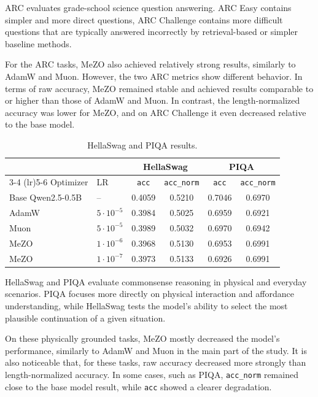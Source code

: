 \documentclass{article}
\begin{document}
ARC evaluates grade-school science question answering. ARC Easy contains simpler and more direct questions, ARC Challenge contains more difficult questions that are typically answered incorrectly by retrieval-based or simpler baseline methods. 

For the ARC tasks, MeZO also achieved relatively strong results, similarly to AdamW and Muon. However, the two ARC metrics show different behavior. In terms of raw accuracy, MeZO remained stable and achieved results comparable to or higher than those of AdamW and Muon. In contrast, the length-normalized accuracy was lower for MeZO, and on ARC Challenge it even decreased relative to the base model.

\begin{table}[ht]
\centering
\begin{tabular}{llcccc}
\toprule
& & \multicolumn{2}{c}{HellaSwag} & \multicolumn{2}{c}{PIQA} \\
\cmidrule(lr){3-4} \cmidrule(lr){5-6}
Optimizer & LR
& \texttt{acc} & \texttt{acc\_norm}
& \texttt{acc} & \texttt{acc\_norm} \\
\midrule
Base Qwen2.5-0.5B & -- & 0.4059 & 0.5210 & 0.7046 & 0.6970 \\
\midrule
AdamW    & $5 \cdot 10^{-5}$ & 0.3984 & 0.5025 & 0.6959 & 0.6921 \\
Muon     & $5 \cdot 10^{-5}$ & 0.3989 & 0.5032 & 0.6970 & 0.6942 \\
MeZO & $1 \cdot 10^{-6}$ & 0.3968 & 0.5130 & 0.6953 & 0.6991 \\
MeZO & $1 \cdot 10^{-7}$ & 0.3973 & 0.5133 & 0.6926 & 0.6991 \\
\bottomrule
\end{tabular}
\caption{HellaSwag and PIQA results.}
\label{tab:hellaswag-piqa-results}
\end{table}

HellaSwag and PIQA evaluate commonsense reasoning in physical and everyday scenarios. PIQA focuses more directly on physical interaction and affordance understanding, while HellaSwag tests the model's ability to select the most plausible continuation of a given situation.

On these physically grounded tasks, MeZO mostly decreased the model's performance, similarly to AdamW and Muon in the main part of the study. It is also noticeable that, for these tasks, raw accuracy decreased more strongly than length-normalized accuracy. In some cases, such as PIQA, \texttt{acc\_norm} remained close to the base model result, while \texttt{acc} showed a clearer degradation.
\end{document}
